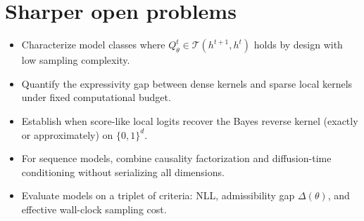 \documentclass[11pt]{article}
\newcommand{\Tset}{\mathcal{T}}
\begin{document}
\section{Sharper open problems}

\begin{itemize}
\item Characterize model classes where $Q_\theta^t\in\Tset(h^{t+1},h^t)$ holds by design with low sampling complexity.
\item Quantify the expressivity gap between dense kernels and sparse local kernels under fixed computational budget.
\item Establish when score-like local logits recover the Bayes reverse kernel (exactly or approximately) on $\{0,1\}^d$.
\item For sequence models, combine causality factorization and diffusion-time conditioning without serializing all dimensions.
\item Evaluate models on a triplet of criteria: NLL, admissibility gap $\Delta(\theta)$, and effective wall-clock sampling cost.
\end{itemize}
\end{document}
